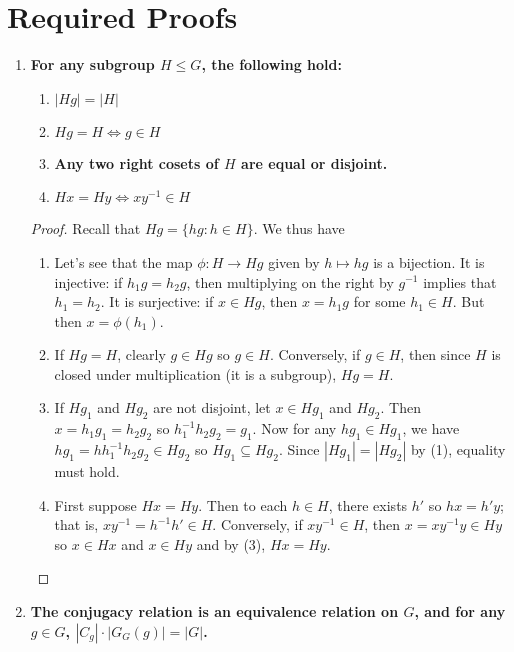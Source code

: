 \documentclass[12pt, a4paper]{article}
\theoremstyle{nonumberplain}
\newtheorem{proof}{Proof}
\begin{document}
\section{Required Proofs}
\begin{enumerate}
    \item \textbf{For any subgroup $H\leq G$, the following hold:}
        \begin{enumerate}[nolistsep]
            \item $|Hg|=|H|$
            \item $Hg=H\Leftrightarrow g\in H$
            \item \textbf{Any two right cosets of $H$ are equal or disjoint.}
            \item $Hx=Hy\Leftrightarrow xy^{-1}\in H$
        \end{enumerate}
        \begin{proof}
            Recall that $Hg=\{hg:h\in H\}$.
            We thus have
            \begin{enumerate}[nolistsep]
                \item Let's see that the map $\phi:H\to Hg$ given by $h\mapsto hg$ is a bijection.
                    It is injective: if $h_1g=h_2g$, then multiplying on the right by $g^{-1}$ implies that $h_1=h_2$.
                    It is surjective: if $x\in Hg$, then $x=h_1g$ for some $h_1\in H$.
                    But then $x=\phi(h_1)$.
                \item If $Hg=H$, clearly $g\in Hg$ so $g\in H$.
                    Conversely, if $g\in H$, then since $H$ is closed under multiplication (it is a subgroup), $Hg=H$.
                \item If $Hg_1$ and $Hg_2$ are not disjoint, let $x\in Hg_1$ and $Hg_2$.
                    Then $x=h_1g_1=h_2g_2$ so $h_1^{-1}h_2g_2=g_1$.
                    Now for any $hg_1\in Hg_1$, we have $hg_1=hh_1^{-1}h_2g_2\in Hg_2$ so $Hg_1\subseteq Hg_2$.
                    Since $|Hg_1|=|Hg_2|$ by (1), equality must hold.
                \item First suppose $Hx=Hy$.
                    Then to each $h\in H$, there exists $h'$ so $hx=h'y$; that is, $xy^{-1}=h^{-1}h'\in H$.
                    Conversely, if $xy^{-1}\in H$, then $x=xy^{-1}y\in Hy$ so $x\in Hx$ and $x\in Hy$ and by (3), $Hx=Hy$.
            \end{enumerate}
        \end{proof}
    \item \textbf{The conjugacy relation is an equivalence relation on $G$, and for any $g\in G$, $|C_g|\cdot|G_G(g)|=|G|$.}

\end{enumerate}
\end{document}
